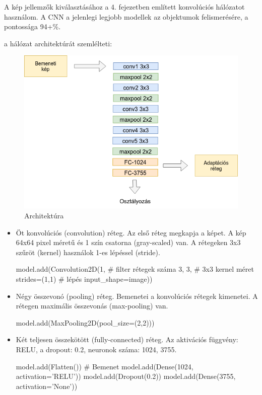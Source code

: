 A kép jellemzők kiválasztásához a 4. fejezetben említett konvolúciós hálózatot használom. A CNN a jelenlegi legjobb modellek az objektumok felismerésére, a pontossága 94+\%.

 a hálózat architektúrát szemlélteti:

\begin{figure}[h]
	\centering
	\includegraphics[scale=0.45]{images/architecture}
	\caption{Architektúra}
	\label{fig:arch}
\end{figure}

\begin{itemize}
\item Öt konvolúciós (convolution) réteg. Az első réteg megkapja a képet. A kép 64x64 pixel méretű és 1 szín csatorna (gray-scaled) van. A rétegeken 3x3 szűröt (kernel) használok 1-es lépéssel (stride).
\begin{python}
model.add(Convolution2D(1,	# filter rétegek száma    
                        3, 3,	# 3x3 kernel méret 
                        strides=(1,1) # lépés
                        input_shape=image))
\end{python}
\item Négy összevonó (pooling) réteg. Bemenetei a konvolúciós rétegek kimenetei. A rétegen maximális összevonás (max-pooling) van.
\begin{python}
model.add(MaxPooling2D(pool_size=(2,2)))
\end{python}
\item Két teljesen összekötött (fully-connected) réteg. Az aktivációs függvény: RELU, a dropout: 0.2, neuronok száma: 1024, 3755.
\begin{python}
model.add(Flatten()) # Bemenet
model.add(Dense(1024, activation='RELU'))
model.add(Dropout(0.2))
model.add(Dense(3755, activation='None'))
\end{python}
\end{itemize}

